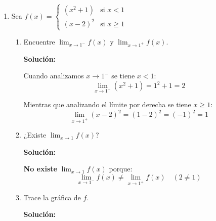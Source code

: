 \documentclass[12pt]{article}
\newcommand{\solucion}{%
    \vspace{0.8em}%
    \textbf{Solución:}%
}
\begin{document}
\begin{enumerate}[label=\alph*)]
    \item Sea $f(x) = \begin{cases} (x^2 + 1) & \text{si } x < 1 \\ (x - 2)^2 & \text{si } x \geq 1 \end{cases}$

    \begin{enumerate}[label=\roman*.]
        \item Encuentre $\lim_{x \to 1^-} f(x)$ y $\lim_{x \to 1^+} f(x)$.

        \solucion

        Cuando analizamos $x \to 1^-$ se tiene $x < 1$:
        \[
            \lim_{x\to1^-}(x^2+1) = 1^2+1 = 2
        \]

        Mientras que analizando el límite por derecha se tiene $x \geq 1$:
        \[
            \lim_{x\to1^+}(x-2)^2 = (1-2)^2 = (-1)^2 = 1
        \]

        \item ¿Existe $\lim_{x \to 1} f(x)$?

        \solucion

        \textbf{No existe} $\displaystyle\lim_{x\to1}f(x)$ porque:
        \[
            \lim_{x\to1^-}f(x) \neq \lim_{x\to1^+}f(x) \quad (2 \neq 1)
        \]

        \item Trace la gráfica de $f$.

        \solucion

        \begin{figure}[H]
                \centering
\end{figure}
\end{enumerate}
\end{enumerate}
\end{document}
